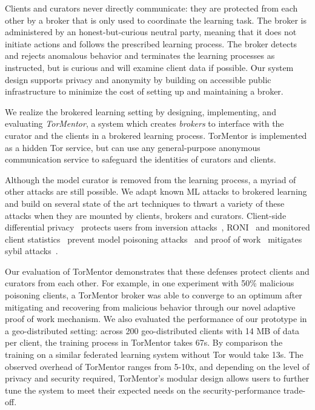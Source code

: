 Clients and curators never directly communicate: they are protected
from each other by a broker that is only used to coordinate the
learning task. The broker is administered by an honest-but-curious
neutral party, meaning that it does not initiate actions and follows
the prescribed learning process. The broker detects and rejects
anomalous behavior and terminates the learning processes as
instructed, but is curious and will examine client data if possible.
Our system design supports privacy and anonymity by building on
accessible public infrastructure to minimize the cost of setting up
and maintaining a broker. 

We realize the brokered learning setting by designing, implementing,
and evaluating \emph{TorMentor}, a system which creates \emph{brokers}
to interface with the curator and the clients
in a brokered learning process. TorMentor is
implemented as a hidden Tor service, but can use any general-purpose
anonymous communication service to safeguard the identities of
curators and clients. %


Although the model curator is removed from the learning process, a
myriad of other attacks are still possible. We adapt known ML attacks
to brokered learning and build on several state of the art techniques
to thwart a variety of these attacks when they are mounted by clients,
brokers and curators. Client-side differential
privacy~\cite{Dwork:2014, Geyer:2017} protects users from inversion
attacks~\cite{Fredrikson:2014, Fredrikson:2015}, 
\ac{RONI}~\cite{Barreno:2010} and monitored client
statistics~\cite{Mozaffari-Kermani:2015} prevent model poisoning
attacks~\cite{Biggio:2012, Huang:2011} and proof of
work~\cite{Back:2002} mitigates sybil attacks~\cite{Douceur:2002}.

Our evaluation of TorMentor demonstrates that these defenses protect
clients and curators from each other. For example, in one experiment
with 50\% malicious poisoning clients, a TorMentor broker was able to
converge to an optimum after mitigating and recovering from 
malicious behavior through our novel adaptive proof of work mechanism.
We also evaluated the performance of our prototype in a geo-distributed
setting: across 200 geo-distributed clients with 14 MB of data
per client, the training process in TorMentor takes 67s. By
comparison the training on a similar federated learning system without
Tor would take 13s. The observed overhead of TorMentor ranges from
5-10x, and depending on the level of privacy and security required,
TorMentor's modular design allows users to further tune the system to
meet their expected needs on the security-performance trade-off.

